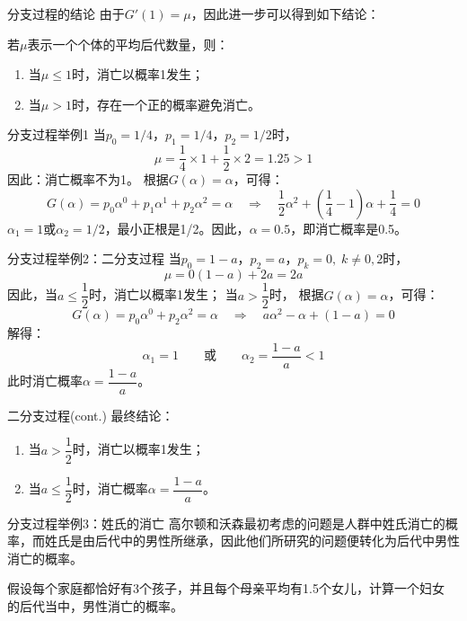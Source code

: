 \documentclass[t]{beamer}
\begin{document}
\begin{frame}{分支过程的结论}
由于$G'(1)=\mu$，因此进一步可以得到如下结论：

若$\mu$表示一个个体的平均后代数量，则：
\begin{enumerate}
	\item 当$\mu\le 1$时，消亡以概率1发生；
	\item 当$\mu>1$时，存在一个正的概率避免消亡。
\end{enumerate}
\end{frame}


\begin{frame}{分支过程举例1}
    当$p_0=1/4$，$p_1=1/4$，$p_2=1/2$时，
\[\mu=\frac{1}{4}\times 1+\frac{1}{2}\times 2=1.25>1\]
因此：消亡概率不为1。
    根据$G(\alpha)=\alpha$，可得：
	\[
G(\alpha)=p_0\alpha^0+p_1\alpha^1+p_2\alpha^2=\alpha \quad \Rightarrow\quad\frac{1}{2}\alpha^2+\left(\frac{1}{4}-1\right)\alpha+\frac{1}{4}=0
 \]
	$\alpha_1=1$或$\alpha_2=1/2$，最小正根是1/2。因此，$\alpha=0.5$，即消亡概率是0.5。
\end{frame}



\begin{frame}{分支过程举例2：二分支过程}
    当$p_0=1-a$，$p_2=a$，$p_k=0,\;k\ne 0,2$时，
    \[\mu=0(1-a)+2a=2a \]
因此，当$a\le \dfrac{1}{2}$时，消亡以概率1发生；
当$a> \dfrac{1}{2}$时，
    根据$G(\alpha)=\alpha$，可得：
    \[
    G(\alpha)=p_0\alpha^0+p_2\alpha^2=\alpha\quad \Rightarrow\quad 
        a\alpha^2-\alpha+(1-a)=0\]
    解得：$$\alpha_1=1\qquad \text{或}\qquad \alpha_2=\frac{1-a}{a}<1$$
此时消亡概率$\alpha=\dfrac{1-a}{a}$。

\end{frame}

\begin{frame}{二分支过程(cont.)}
最终结论：
    \begin{enumerate}
        \item 当$a>\dfrac{1}{2}$时，消亡以概率1发生；
        \item 当$a\le \dfrac{1}{2}$时，消亡概率$\alpha=\dfrac{1-a}{a}$。
    \end{enumerate}
\end{frame}




\begin{frame}{分支过程举例3：姓氏的消亡}
    高尔顿和沃森最初考虑的问题是人群中姓氏消亡的概率，而姓氏是由后代中的男性所继承，因此他们所研究的问题便转化为后代中男性消亡的概率。

    假设每个家庭都恰好有3个孩子，并且每个母亲平均有1.5个女儿，计算一个妇女
    的后代当中，男性消亡的概率。
\end{frame}
\end{document}
